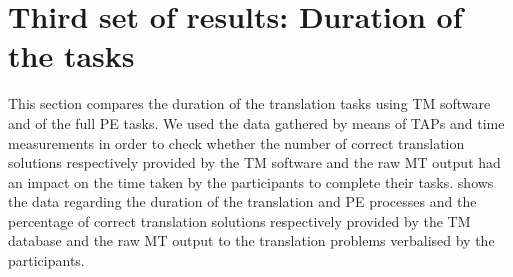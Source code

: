 \documentclass[output=paper]{LSP/langsci}
\begin{document}
\section{Third set of results: Duration of the tasks}\label{ressetti-gaspari:sec:6}

This section compares the duration of the translation tasks using TM software and of the full PE tasks. We used the data gathered by means of TAPs and time measurements in order to check whether the number of correct translation solutions respectively provided by the TM software and the raw MT output had an impact on the time taken by the participants to complete their tasks.  shows the data regarding the duration of the translation and PE processes and the percentage of correct translation solutions respectively provided by the TM database and the raw MT output to the translation problems verbalised by the participants.



\begin{table}
 \caption{Duration of the tasks and percentage of correct translation solutions}
 \label{rossetti-gaspari:tab:5}
\end{table}
\end{document}
